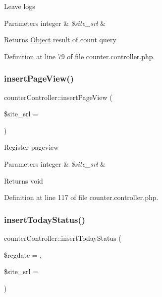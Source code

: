 Leave logs


\begin{DoxyParams}[1]{Parameters}
integer & {\em \$site\+\_\+srl} & \\
\hline
\end{DoxyParams}
\begin{DoxyReturn}{Returns}
\hyperlink{classObject}{Object} result of count query 
\end{DoxyReturn}


Definition at line 79 of file counter.\+controller.\+php.

\mbox{\label{classcounterController_a7e7bfcdabc8855e8fe6835eaaa2c7168}} 
\subsubsection{\texorpdfstring{insert\+Page\+View()}{insertPageView()}}
{\footnotesize\ttfamily counter\+Controller\+::insert\+Page\+View (\begin{DoxyParamCaption}\item[{}]{\$site\+\_\+srl = {} }\end{DoxyParamCaption})}

Register pageview


\begin{DoxyParams}[1]{Parameters}
integer & {\em \$site\+\_\+srl} & \\
\hline
\end{DoxyParams}
\begin{DoxyReturn}{Returns}
void 
\end{DoxyReturn}


Definition at line 117 of file counter.\+controller.\+php.

\mbox{\label{classcounterController_aff29d33d56116a804589d86b883e83dc}} 
\subsubsection{\texorpdfstring{insert\+Today\+Status()}{insertTodayStatus()}}
{\footnotesize\ttfamily counter\+Controller\+::insert\+Today\+Status (\begin{DoxyParamCaption}\item[{}]{\$regdate = {},  }\item[{}]{\$site\+\_\+srl = {} }\end{DoxyParamCaption})}

